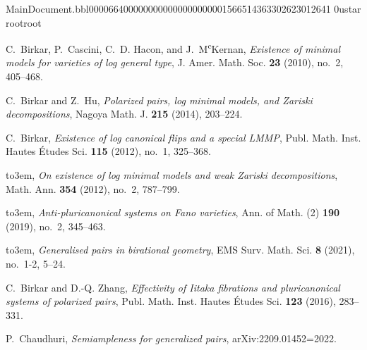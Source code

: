 MainDocument.bbl                                                                                    0000664 0000000 0000000 00000015665 14363302623 012641  0                                                                                                    ustar   root                            root                                                                                                                                                                                                                   \newcommand{\etalchar}[1]{$^{#1}$}
\providecommand{\bysame}{\leavevmode\hbox to3em{\hrulefill}\thinspace}
\providecommand{\MR}{\relax\ifhmode\unskip\space\fi MR }
\providecommand{\MRhref}[2]{%
  \href{http://www.ams.org/mathscinet-getitem?mr=#1}{#2}
}
\providecommand{\href}[2]{#2}
\begin{thebibliography}{BCHM10}

C.~Birkar, P.~Cascini, C.~D. Hacon, and J.~M\textsuperscript{c}Kernan,
  \emph{Existence of minimal models for varieties of log general type}, J.
  Amer. Math. Soc. \textbf{23} (2010), no.~2, 405--468.

C.~Birkar and Z.~Hu, \emph{Polarized pairs, log minimal models, and {Z}ariski
  decompositions}, Nagoya Math. J. \textbf{215} (2014), 203--224.

C.~Birkar, \emph{Existence of log canonical flips and a special {LMMP}}, Publ.
  Math. Inst. Hautes \'Etudes Sci. \textbf{115} (2012), no.~1, 325--368.

\bysame, \emph{On existence of log minimal models and weak {Z}ariski
  decompositions}, Math. Ann. \textbf{354} (2012), no.~2, 787--799.

\bysame, \emph{Anti-pluricanonical systems on {F}ano varieties}, Ann. of Math.
  (2) \textbf{190} (2019), no.~2, 345--463.

\bysame, \emph{Generalised pairs in birational geometry}, EMS Surv. Math. Sci.
  \textbf{8} (2021), no.~1-2, 5--24.

C.~Birkar and D.-Q. Zhang, \emph{Effectivity of {I}itaka fibrations and
  pluricanonical systems of polarized pairs}, Publ. Math. Inst. Hautes \'Etudes
  Sci. \textbf{123} (2016), 283--331.

P.~Chaudhuri, \emph{Semiampleness for generalized pairs},
  arXiv:2209.01452=\hbox{2022}.


\end{thebibliography}
